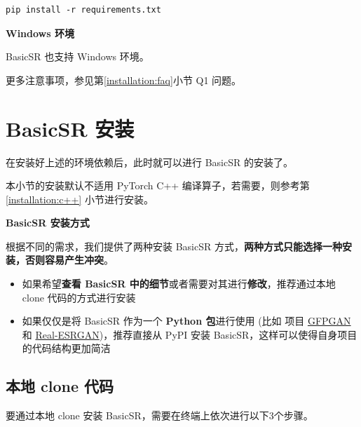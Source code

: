 \documentclass[../main.tex]{subfiles}
\begin{document}
\begin{verbatim}
pip install -r requirements.txt
\end{verbatim}

\begin{note} %
    \textbf{Windows 环境}

    BasicSR 也支持 Windows 环境。

    更多注意事项，参见第\ref{installation:faq}小节 Q1 问题。
\end{note}

\section{BasicSR 安装}\label{installation:install}

在安装好上述的环境依赖后，此时就可以进行 BasicSR 的安装了。

本小节的安装默认不适用 PyTorch C++ 编译算子，若需要，则参考第 \ref{installation:c++} 小节进行安装。

\begin{hl} %
    \textbf{BasicSR 安装方式}

    根据不同的需求，我们提供了两种安装 BasicSR 方式，{\color{red}\textbf{两种方式只能选择一种安装，否则容易产生冲突}}。

    \begin{itemize}
        \item 如果希望\textbf{查看 BasicSR 中的细节}或者需要对其进行\textbf{修改}，推荐通过本地 clone 代码的方式进行安装
        \item 如果仅仅是将 BasicSR 作为一个\textbf{ Python 包}进行使用 (比如 项目 \href{https://github.com/TencentARC/GFPGAN}{GFPGAN} 和 \href{https://github.com/xinntao/Real-ESRGAN}{Real-ESRGAN})，推荐直接从 PyPI 安装 BasicSR，这样可以使得自身项目的代码结构更加简洁
    \end{itemize}
\end{hl}

\subsection{本地 clone 代码}\label{installation:local-clone}

要通过本地 clone 安装 BasicSR，需要在终端上依次进行以下3个步骤。
\end{document}
